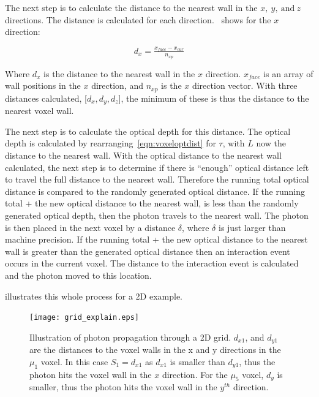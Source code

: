 The next step is to calculate the distance to the nearest wall in the $x,\ y,\ \text{and}\ z$ directions.
The distance is calculated for each direction.~ shows for the $x$ direction:

\begin{equation}
d_{x} = \tfrac{x_{face} - x_{cur}}{n_{xp}}
\label{eqn:walldist}
\end{equation}

Where $d_x$ is the distance to the nearest wall in the $x$ direction. $x_{face}$ is an array of wall positions in the $x$ direction, and $n_{xp}$ is the $x$ direction vector.
With three distances calculated, [$d_x, d_y, d_z$], the minimum of these is thus the distance to the nearest voxel wall.

The next step is to calculate the optical depth for this distance.
The optical depth is calculated by rearranging~\cref{eqn:voxeloptdist} for $\tau$, with $L$ now the distance to the nearest wall.
With the optical distance to the nearest wall calculated, the next step is to determine if there is ``enough'' optical distance left to travel the full distance to the nearest wall.
Therefore the running total optical distance is compared to the randomly generated optical distance.
If the running total + the new optical distance to the nearest wall, is less than the randomly generated optical depth, then the photon travels to the nearest wall.
The photon is then placed in the next voxel by a distance $\delta$, where $\delta$ is just larger than machine precision.
If the running total + the new optical distance to the nearest wall is greater than the generated optical distance then an interaction event occurs in the current voxel.
The distance to the interaction event is calculated and the photon moved to this location. 

 illustrates this whole process for a 2D example.

\begin{figure}[!ht]
	\centering
	\texttt{[image: grid\_explain.eps]}
	\caption{Illustration of photon propagation through a 2D grid. $d_{x1}$, and $d_{y1}$ are the distances to the voxel walls in the x and y directions in the $\mu_1$ voxel. In this case $S_1=d_{x1}$ as $d_{x1}$ is smaller than $d_{y1}$, thus the photon hits the voxel wall in the $x$ direction. For the $\mu_5$ voxel, $d_y$ is smaller, thus the photon hits the voxel wall in the $y^{th}$ direction.}
	\label{fig:voxelpropexplain}
\end{figure}

